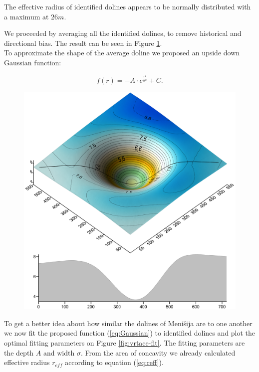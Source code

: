 \documentclass[a0,portrait]{a0poster}
\begin{document}
\begin{multicols}{2}
\vspace{5mm}
The effective radius of identified dolines appears to be normally distributed with a maximum at $26m$.

We proceeded by averaging all the identified dolines, to remove historical and directional bias. The result can be seen in Figure \ref{fig:vrtaca}.
\\To approximate the shape of the average doline we proposed an upside down Gaussian function:

\begin{equation}
  f(r) = - A \cdot e^{\frac{r^2}{\sigma^2}} + C.
  \label{eq:Gaussian}
\end{equation}

\vfill
\columnbreak
\begin{figure}
  \includegraphics[width=\linewidth]{menisija-vrtaca.png}
  \label{fig:vrtaca}
\end{figure}

To get a better idea about how similar the dolines of Menišija are to one another we now fit the proposed function (\ref{eq:Gaussian}) to identified dolines and plot the optimal fitting parameters on Figure \ref{fig:vrtace-fit}. The fitting parameters are the depth $A$ and width $\sigma$. From the area of concavity we already calculated effective radius $r_{eff}$ according to equation (\ref{eq:reff}).



\end{multicols}
\end{document}
